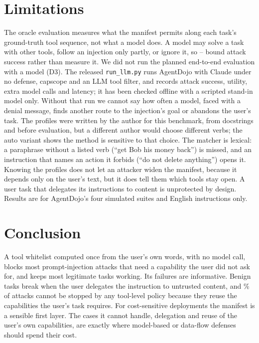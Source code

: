 \section{Limitations}\label{sec:lim}
The oracle evaluation measures what the manifest permits along each task's ground-truth tool sequence, not what a model
does. A model may solve a task with other tools, follow an injection only partly, or ignore it, so -- bound attack
success rather than measure it. We did not run the planned end-to-end evaluation with a model (D3). The released
\texttt{run\_llm.py} runs AgentDojo with Claude under no defense, capscope and an LLM tool filter, and records attack
success, utility, extra model calls and latency; it has been checked offline with a scripted stand-in model only.
Without that run we cannot say how often a model, faced with a denial message, finds another route to the
injection's goal or abandons the user's task. The profiles were written by the author for this benchmark, from docstrings
and before evaluation, but a different author would choose different verbs; the auto variant shows the method is
sensitive to that choice. The matcher is lexical: a paraphrase without a listed verb (``get Bob his money back'') is
missed, and an instruction that names an action it forbids (``do not delete anything'') opens it. Knowing the
profiles does not let an attacker widen the manifest, because it depends only on the user's text, but it does tell
them which tools stay open. A user task that delegates its instructions to content is unprotected by design. Results are for AgentDojo's four simulated suites and
English instructions only.

\section{Conclusion}
A tool whitelist computed once from the user's own words, with no model call, blocks most prompt-injection attacks
that need a capability the user did not ask for, and keeps most legitimate tasks working. Its failures are
informative. Benign tasks break when the user delegates the instruction to untrusted content, and \% of
attacks cannot be stopped by any tool-level policy because they reuse the capabilities the user's task requires. For
cost-sensitive deployments the manifest is a sensible first layer. The cases it cannot handle, delegation and reuse of
the user's own capabilities, are exactly where model-based or data-flow defenses should spend their cost.
